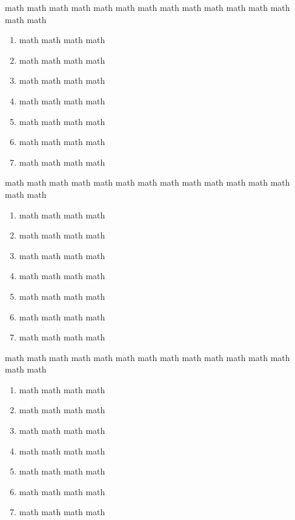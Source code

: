 \documentclass[12pt,a4paper]{article}
\begin{document}
\begin{multicols}{2}
\begin{Exercice}
\begin{enumerate}[1)]
	\end{enumerate}

\end{Exercice}

\begin{Exercice}math math math math math math math math math math math math math math math
\begin{enumerate}[label=\textbf{\color{gris}\arabic*.}]
    \item math math math math
    \item math math math math
    \item math math math math
    \item math math math math
    \item math math math math
    \item math math math math
    \item math math math math
\end{enumerate}
\end{Exercice}
\begin{Exercice}math math math math math math math math math math math math math math math
\begin{enumerate}[label=\textbf{\color{gris}\arabic*.}]
    \item math math math math
    \item math math math math
    \item math math math math
    \item math math math math
    \item math math math math
    \item math math math math
    \item math math math math
\end{enumerate}
\end{Exercice}
\begin{Exercice}math math math math math math math math math math math math math math math
\begin{enumerate}[label=\textbf{\color{gris}\arabic*.}]
    \item math math math math
    \item math math math math
    \item math math math math
    \item math math math math
    \item math math math math
    \item math math math math
    \item math math math math
\end{enumerate}

\end{Exercice}
\end{multicols}
\end{document}
